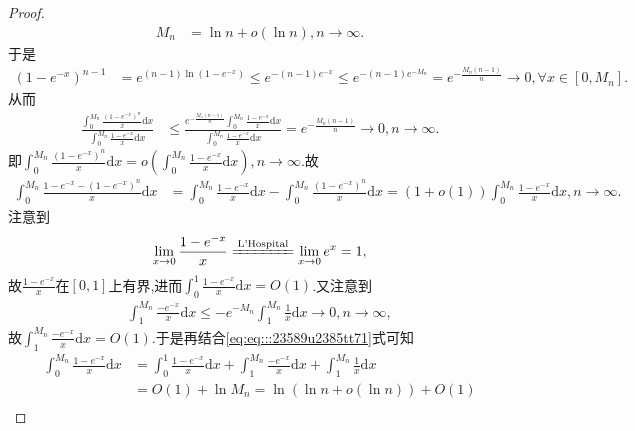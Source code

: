 \documentclass[../../main.tex]{subfiles}
\begin{document}
\begin{proof}
\begin{align}
M_n&=\ln n+o\left( \ln n \right) ,n\rightarrow \infty .\label{eq:eq:::23589u2385tt71}
\end{align}
于是
\begin{align*}
\left( 1-e^{-x} \right) ^{n-1}&=e^{\left( n-1 \right) \ln \left( 1-e^{-x} \right)}\leqslant e^{-\left( n-1 \right) e^{-x}}\leqslant e^{-\left( n-1 \right) e^{-M_n}}=e^{-\frac{M_n\left( n-1 \right)}{n}}\rightarrow 0,\forall x\in \left[ 0,M_n \right] .
\end{align*}
从而
\begin{align*}
\frac{\int_0^{M_n}{\frac{\left( 1-e^{-x} \right) ^n}{x}\mathrm{d}x}}{\int_0^{M_n}{\frac{1-e^{-x}}{x}\mathrm{d}x}}&\leqslant \frac{e^{-\frac{M_n\left( n-1 \right)}{n}}\int_0^{M_n}{\frac{1-e^{-x}}{x}\mathrm{d}x}}{\int_0^{M_n}{\frac{1-e^{-x}}{x}\mathrm{d}x}}=e^{-\frac{M_n\left( n-1 \right)}{n}}\rightarrow 0,n\rightarrow \infty .
\end{align*}
即$\int_0^{M_n}{\frac{\left( 1-e^{-x} \right) ^n}{x}\mathrm{d}x}=o\left( \int_0^{M_n}{\frac{1-e^{-x}}{x}\mathrm{d}x} \right) ,n\rightarrow \infty .$故
\begin{align}
\int_0^{M_n}{\frac{1-e^{-x}-\left( 1-e^{-x} \right) ^n}{x}\mathrm{d}x}&=\int_0^{M_n}{\frac{1-e^{-x}}{x}\mathrm{d}x}-\int_0^{M_n}{\frac{\left( 1-e^{-x} \right) ^n}{x}\mathrm{d}x}=\left( 1+o\left( 1 \right) \right) \int_0^{M_n}{\frac{1-e^{-x}}{x}\mathrm{d}x},n\rightarrow \infty .\label{eq:108.1001}
\end{align}
注意到
\begin{align*}
\lim_{x\rightarrow 0}\frac{1-e^{-x}}{x}\xlongequal{\text{L'Hospital}}\lim_{x\rightarrow 0}e^x=1,
\end{align*}
故$\frac{1-e^{-x}}{x}$在$\left[ 0,1 \right]$上有界,进而$\int_0^1{\frac{1-e^{-x}}{x}\mathrm{d}x}=O(1)$.又注意到
\begin{align*}
\int_1^{M_n}{\frac{-e^{-x}}{x}\mathrm{d}x}\leqslant -e^{-M_n}\int_1^{M_n}{\frac{1}{x}\mathrm{d}x}\rightarrow 0,n\rightarrow \infty ,
\end{align*}
故$\int_1^{M_n}{\frac{-e^{-x}}{x}\mathrm{d}x}=O(1)$.于是再结合\eqref{eq:eq:::23589u2385tt71}式可知
\begin{align*}
\int_0^{M_n}{\frac{1-e^{-x}}{x}\mathrm{d}x}&=\int_0^1{\frac{1-e^{-x}}{x}\mathrm{d}x}+\int_1^{M_n}{\frac{-e^{-x}}{x}\mathrm{d}x}+\int_1^{M_n}{\frac{1}{x}\mathrm{d}x} \\
&=O\left( 1 \right) +\ln M_n=\ln \left( \ln n+o\left( \ln n \right) \right) +O\left( 1 \right) \\

\end{align*}
\end{proof}
\end{document}
